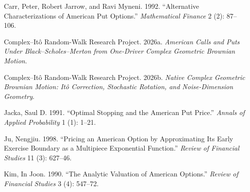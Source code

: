 \documentclass[
  english,
  10pt,
  letterpaper,
  DIV=11,
  numbers=noendperiod]{scrartcl}
\newlength{\cslhangindent}
\newenvironment{CSLReferences}[2] %
 {\begin{list}{}{%
  \setlength{\itemindent}{0pt}
  \setlength{\leftmargin}{0pt}
  \setlength{\parsep}{0pt}
  \ifodd #1
   \setlength{\leftmargin}{\cslhangindent}
   \setlength{\itemindent}{-1\cslhangindent}
  \fi
  \setlength{\itemsep}{#2\baselineskip}}}
 {\end{list}}
\begin{document}
\protect{}\label{refs}
\begin{CSLReferences}{1}{1}
Carr, Peter, Robert Jarrow, and Ravi Myneni. 1992. {``Alternative
Characterizations of {A}merican Put Options.''} \emph{Mathematical
Finance} 2 (2): 87--106.

Complex--Itô Random-Walk Research Project. 2026a. \emph{American Calls
and Puts Under {B}lack--{S}choles--{M}erton from One-Driver Complex
Geometric Brownian Motion}.

Complex--Itô Random-Walk Research Project. 2026b. \emph{Native Complex
Geometric Brownian Motion: Itô Correction, Stochastic Rotation, and
Noise-Dimension Geometry}.

Jacka, Saul D. 1991. {``Optimal Stopping and the {A}merican Put
Price.''} \emph{Annals of Applied Probability} 1 (1): 1--21.

Ju, Nengjiu. 1998. {``Pricing an {A}merican Option by Approximating Its
Early Exercise Boundary as a Multipiece Exponential Function.''}
\emph{Review of Financial Studies} 11 (3): 627--46.

Kim, In Joon. 1990. {``The Analytic Valuation of American Options.''}
\emph{Review of Financial Studies} 3 (4): 547--72.

\end{CSLReferences}
\end{document}
